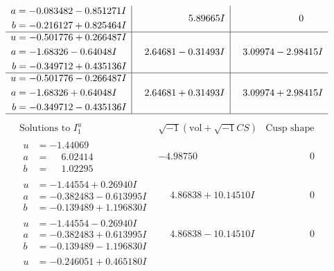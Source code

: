 \documentclass[1p]{elsarticle_modified}
\theoremstyle{definition}
\newcommand{\I}{\sqrt{-1}}
\begin{document}
$$\begin{array}{c|c|c}
\begin{aligned}
a &= -0.083482 - 0.851271 I \\
b &= -0.216127 + 0.825464 I\end{aligned}
 & \phantom{-0.000000 -}5.89665 I & \phantom{-0.000000 } 0 \\ \hline\begin{aligned}
u &= -0.501776 + 0.266487 I \\
a &= -1.68326 - 0.64048 I \\
b &= -0.349712 + 0.435136 I\end{aligned}
 & \phantom{-}2.64681 - 0.31493 I & \phantom{-}3.09974 - 2.98415 I \\ \hline\begin{aligned}
u &= -0.501776 - 0.266487 I \\
a &= -1.68326 + 0.64048 I \\
b &= -0.349712 - 0.435136 I\end{aligned}
 & \phantom{-}2.64681 + 0.31493 I & \phantom{-}3.09974 + 2.98415 I\\
 \hline 
 \end{array}$$\newpage$$\begin{array}{c|c|c}  
\text{Solutions to }I^u_{1}& \I (\text{vol} + \sqrt{-1}CS) & \text{Cusp shape}\\
 \hline 
\begin{aligned}
u &= -1.44069\phantom{ +0.000000I} \\
a &= \phantom{-}6.02414\phantom{ +0.000000I} \\
b &= \phantom{-}1.02295\phantom{ +0.000000I}\end{aligned}
 & -4.98750\phantom{ +0.000000I} & \phantom{-0.000000 } 0 \\ \hline\begin{aligned}
u &= -1.44554 + 0.26940 I \\
a &= -0.382483 - 0.613995 I \\
b &= -0.139489 + 1.196830 I\end{aligned}
 & \phantom{-}4.86838 + 10.14510 I & \phantom{-0.000000 } 0 \\ \hline\begin{aligned}
u &= -1.44554 - 0.26940 I \\
a &= -0.382483 + 0.613995 I \\
b &= -0.139489 - 1.196830 I\end{aligned}
 & \phantom{-}4.86838 - 10.14510 I & \phantom{-0.000000 } 0 \\ \hline\begin{aligned}
u &= -0.246051 + 0.465180 I \\

\end{aligned}
\end{array}$$
\end{document}
